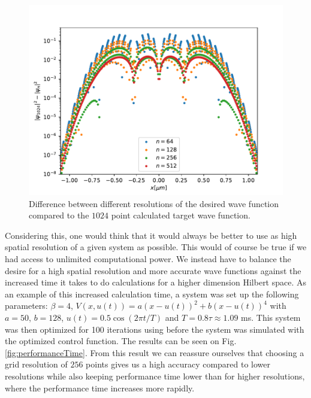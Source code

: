 \documentclass[aps,pra,reprint,superscriptaddress]{revtex4-1}
\begin{document}
\begin{figure}
	\includegraphics[width=\columnwidth]{graphics/ExcitedstateGrid.pdf}
	\caption{Difference between different resolutions of the desired wave function compared to the $1024$ point calculated target wave function.}
	\label{fig:excitedstateGrid}
\end{figure}

Considering this, one would think that it would always be better to use as high spatial resolution of a given system as possible. This would of course be true if we had access to unlimited computational power. We instead have to balance the desire for a high spatial resolution and more accurate wave functions against the increased time it takes to do calculations for a higher dimension Hilbert space. As an example of this increased calculation time, a system was set up the following parameters: $\beta = 4$, $V(x,u(t)) = a(x-u(t))^2 + b(x-u(t))^4$ with $a=50$, $b=128$, $u(t)=0.5 \cos(2\pi t/T)$ and $T=0.8 \tau \approx 1.09$ ms. This system was then optimized for 100 iterations using  before the system was simulated with the optimized control function. The results can be seen on Fig. \ref{fig:performanceTime}. From this result we can reassure ourselves that choosing a grid resolution of $256$ points gives us a high accuracy compared to lower resolutions while also keeping performance time lower than for higher resolutions, where the performance time increases more rapidly.
\end{document}

